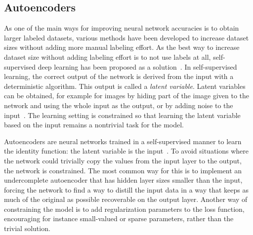 \documentclass[english,twoside,openright]{UH_DS_MSc}
\begin{document}
\subsection{Autoencoders}
\label{sect:autoencoders}
As one of the main ways for improving neural network accuracies is to obtain larger labeled datasets, various methods have been developed to increase dataset sizes without adding more manual labeling effort. As the best way to increase dataset 
size without adding labeling effort is to not use labels at all, self-supervised deep learning has been proposed 
as a solution~\cite{goodfellow}. In self-supervised learning, the correct output of the network is
derived from the input with a deterministic algorithm. This output is called a \textit{latent variable}.
Latent variables can be obtained, for example for images by hiding part of the image given to the network
and using the whole input as the output, or by adding noise to the input~\cite{princebook}.
The learning setting is constrained so that learning the latent variable 
based on the input remains a nontrivial task for the model.

Autoencoders are neural networks trained in a self-supervised manner to learn the identity function: the latent 
variable is the input~\cite{goodfellow}. To avoid situations where the network could trivially copy the values from 
the input layer to the output, the network is constrained. The most common way for this is to implement an undercomplete
autoencoder that has hidden layer sizes smaller than the input, forcing the network to find a way to distill 
the input data in a way that keeps as much of the original as possible recoverable on the output layer.
Another way of constraining the model is to add regularization parameters to the 
loss function, encouraging for instance small-valued or sparse parameters, rather than the trivial solution.
		
\end{document}
